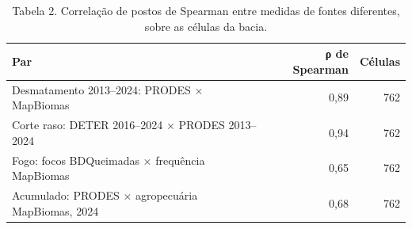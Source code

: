 \begin{table}
\caption{Tabela 2. Correlação de postos de Spearman entre medidas de fontes diferentes, sobre as células da bacia.}
\label{tab:04_perturbacao:tapajos:concordancia}
\begin{tabular}{lrr}
\toprule
Par & ρ de Spearman & Células \\
\midrule
Desmatamento 2013–2024: PRODES × MapBiomas & 0,89 & 762 \\
Corte raso: DETER 2016–2024 × PRODES 2013–2024 & 0,94 & 762 \\
Fogo: focos BDQueimadas × frequência MapBiomas & 0,65 & 762 \\
Acumulado: PRODES × agropecuária MapBiomas, 2024 & 0,68 & 762 \\
\bottomrule
\end{tabular}
\end{table}
